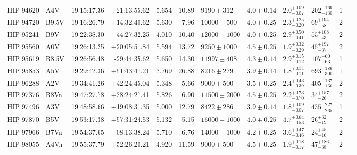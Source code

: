 \begin{tiny}
\begin{longtable}{|l|lrrrrllllll|}
   HIP 94620 &      A4V &    19:15:17.36 &   +21:13:55.62 &   5.654 &     10.89 &    $9190 \pm 312$ &  $4.0 \pm 0.14$ &  $2.0^{+0.09}_{-0.07}$ &   $202^{+169}_{-130}$ &       1 \\
   HIP 94720 &    B9.5V &    19:16:26.79 &   +14:32:40.62 &   5.630 &      7.96 &   $10000 \pm 500$ &  $4.0 \pm 0.25$ &  $2.3^{+0.25}_{-0.20}$ &     $69^{+194}_{-58}$ &       2 \\
   HIP 95241 &      B9V &    19:22:38.30 &   -44:27:32.25 &   4.010 &     10.40 &  $12000 \pm 1000$ &  $4.0 \pm 0.25$ &  $2.9^{+0.50}_{-0.41}$ &     $53^{+108}_{-43}$ &       2 \\
   HIP 95560 &      A0V &    19:26:13.25 &   +20:05:51.84 &   5.594 &     13.72 &   $9250 \pm 1000$ &  $4.5 \pm 0.25$ &  $1.9^{+0.32}_{-0.29}$ &     $45^{+197}_{-37}$ &       2 \\
   HIP 95619 &    B8.5V &    19:26:56.48 &   -29:44:35.62 &   5.650 &     14.30 &   $11997 \pm 408$ &  $4.3 \pm 0.14$ &  $2.9^{+0.15}_{-0.12}$ &     $107^{+60}_{-63}$ &       1 \\
   HIP 95853 &      A5V &    19:29:42.36 &   +51:43:47.21 &   3.769 &     26.88 &    $8216 \pm 279$ &  $3.9 \pm 0.14$ &  $1.8^{+0.14}_{-0.11}$ &   $693^{+186}_{-300}$ &       1 \\
   HIP 96288 &      A2V &    19:34:41.26 &   +42:24:45.04 &   5.348 &      5.66 &    $9000 \pm 500$ &  $3.5 \pm 0.25$ &  $2.4^{+0.43}_{-0.39}$ &   $405^{+137}_{-166}$ &       2 \\
   HIP 97376 &     B8Vn &    19:47:27.78 &   +38:24:27.41 &   5.826 &      6.90 &  $11500 \pm 2000$ &  $4.5 \pm 0.25$ &  $2.2^{+0.73}_{-0.70}$ &     $34^{+157}_{-26}$ &       2 \\
   HIP 97496 &      A3V &    19:48:58.66 &   +19:08:31.35 &   5.000 &     12.79 &    $8422 \pm 286$ &  $3.9 \pm 0.14$ &  $1.8^{+0.09}_{-0.07}$ &   $435^{+227}_{-265}$ &       1 \\
   HIP 97870 &      B5V &    19:53:17.38 &   +57:31:24.53 &   5.132 &      5.15 &  $16000 \pm 1000$ &  $4.0 \pm 0.25$ &  $4.7^{+0.64}_{-0.53}$ &      $26^{+32}_{-19}$ &       2 \\
   HIP 97966 &     B7Vn &    19:54:37.65 &   -08:13:38.24 &   5.710 &      6.76 &  $14000 \pm 1000$ &  $4.2 \pm 0.25$ &  $3.6^{+0.47}_{-0.46}$ &      $24^{+45}_{-16}$ &       2 \\
   HIP 98055 &     A4Vn &    19:55:37.79 &   +52:26:20.21 &   4.920 &     11.59 &    $9000 \pm 500$ &  $4.5 \pm 0.25$ &  $1.9^{+0.18}_{-0.17}$ &     $47^{+186}_{-38}$ &       2 \\

\end{longtable}
\end{tiny}

